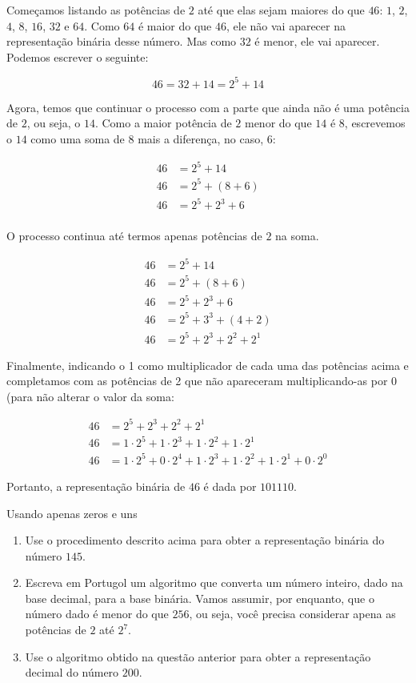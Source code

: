 Começamos listando as potências de $2$ até que elas sejam maiores do que $46$: $1$, $2$, $4$, $8$, $16$, $32$ e $64$. Como $64$ é maior do que $46$, ele não vai aparecer na representação binária desse número. Mas como $32$ é menor, ele vai aparecer. Podemos escrever o seguinte:

\begin{equation*}
46=32+14=2^5+14
\end{equation*}

Agora, temos que continuar o processo com a parte que ainda não é uma potência de $2$, ou seja, o $14$. Como a maior potência de $2$ menor do que $14$ é $8$, escrevemos o $14$ como uma soma de 8 mais a diferença, no caso, $6$:

\begin{align*}
46&=2^5+14 \\
46&=2^5+(8+6) \\
46&=2^5+2^3+6 \\
\end{align*}
 
O processo continua até termos apenas potências de $2$ na soma.

\begin{align*}
46&=2^5+14 \\
46&=2^5+(8+6) \\
46&=2^5+2^3+6 \\
46&=2^5+3^3+(4+2) \\
46&=2^5+2^3+2^2+2^1
\end{align*}
 
Finalmente, indicando o 1 como multiplicador de cada uma das potências acima e completamos com as potências de 2 que não apareceram multiplicando-as por 0 (para não alterar o valor da soma:

\begin{align*}
46&=2^5+2^3+2^2+2^1 \\
46&=1\cdot2^5+1\cdot2^3+1\cdot2^2+1\cdot2^1 \\
46&=1\cdot2^5+0\cdot2^4+1\cdot2^3+1\cdot2^2+1\cdot2^1+0\cdot2^0
\end{align*}
 
Portanto, a representação binária de $46$ é dada por $101110$.

\begin{task}{Usando apenas zeros e uns}
\begin{enumerate}
\item Use o procedimento descrito acima para obter a representação binária do número $145$.

\item Escreva em Portugol um algoritmo que converta um número inteiro, dado na base decimal, para a base binária. Vamos assumir, por enquanto, que o número dado é menor do que $256$, ou seja, você precisa considerar apena as potências de $2$ até $2^7$.

\item Use o algoritmo obtido na questão anterior para obter a representação decimal do número $200$.
\end{enumerate}
\end{task}


